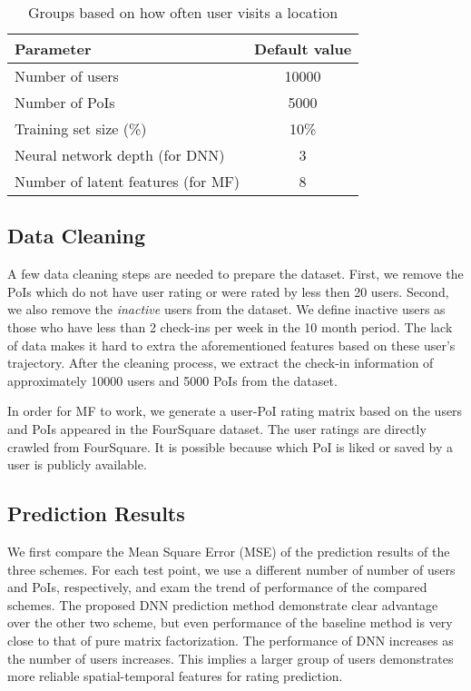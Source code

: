 \begin{table}[htbp]
\begin{center}
\caption{Groups based on how often user visits a location \label{settings}}
\begin{tabular}{|l|c|} \hline
\textbf{Parameter} & \textbf{Default value} \\ \hline
Number of users & 10000  \\ \hline
Number of PoIs & 5000 \\ \hline
Training set size (\%) & 10\% \\ \hline
Neural network depth (for DNN)& 3 \\ \hline
Number of latent features (for MF) & 8 \\ \hline
\end{tabular}
\end{center}
\end{table}

\subsection{Data Cleaning}

A few data cleaning steps are needed to prepare the dataset. First, we remove the PoIs which do not have user rating or were rated by less then 20 users. Second, we also remove the \textit{inactive} users from the dataset. We define inactive users as those who have less than 2 check-ins per week in the 10 month period. The lack of data makes it hard to extra the aforementioned features based on these user's trajectory. After the cleaning process, we extract the check-in information of approximately 10000 users and 5000 PoIs from the dataset.

In order for MF to work, we generate a user-PoI rating matrix based on the users and PoIs appeared in the FourSquare dataset. The user ratings are directly crawled from FourSquare. It is possible because which PoI is liked or saved by a user is publicly available.

\subsection{Prediction Results}

We first compare the Mean Square Error (MSE) of the prediction results of the three schemes. For each test point, we use a different number of number of users and PoIs, respectively, and exam the trend of performance of the compared schemes. The proposed DNN prediction method demonstrate clear advantage over the other two scheme, but even performance of the baseline method is very close to that of pure matrix factorization. The performance of DNN increases as the number of users increases. This implies a larger group of users demonstrates more reliable spatial-temporal features for rating prediction.


